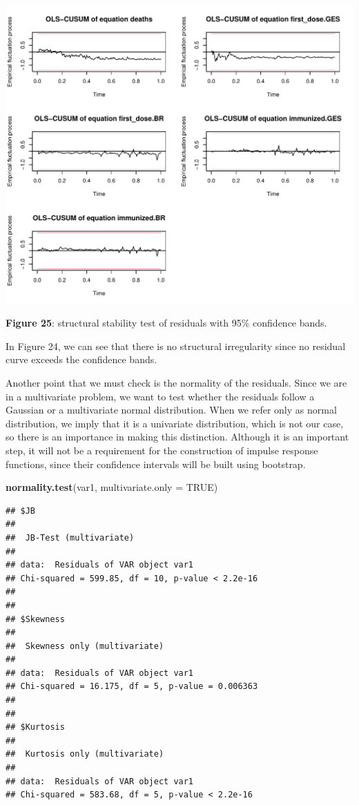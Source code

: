 \documentclass[
]{article}
\newenvironment{Shaded}{\begin{snugshade}}{\end{snugshade}}
\newcommand{\AttributeTok}[1]{\textcolor[rgb]{0.13,0.29,0.53}{#1}}
\newcommand{\ConstantTok}[1]{\textcolor[rgb]{0.56,0.35,0.01}{#1}}
\newcommand{\FunctionTok}[1]{\textcolor[rgb]{0.13,0.29,0.53}{\textbf{#1}}}
\newcommand{\NormalTok}[1]{#1}
\renewenvironment{Shaded}{\begin{mdframed}[ backgroundcolor=shadecolor, linecolor = shadecolor, leftmargin=\dimexpr\leftmargin-2pt\relax, innerleftmargin=1.6pt, innertopmargin=5pt, skipabove=10pt,skipbelow=3pt ]}{\end{mdframed}}
\begin{document}
\begin{center}\includegraphics[width=\linewidth]{IF_results_ENG_files/figure-latex/unnamed-chunk-36-1} \end{center}

\textbf{Figure 25}: structural stability test of residuals with 95\%
confidence bands.

In Figure 24, we can see that there is no structural irregularity since
no residual curve exceeds the confidence bands.

Another point that we must check is the normality of the residuals.
Since we are in a multivariate problem, we want to test whether the
residuals follow a Gaussian or a multivariate normal distribution. When
we refer only as normal distribution, we imply that it is a univariate
distribution, which is not our case, so there is an importance in making
this distinction. Although it is an important step, it will not be a
requirement for the construction of impulse response functions, since
their confidence intervals will be built using bootstrap.

\begin{Shaded}
\begin{Highlighting}[]
\FunctionTok{normality.test}\NormalTok{(var1, }\AttributeTok{multivariate.only =} \ConstantTok{TRUE}\NormalTok{)}
\end{Highlighting}
\end{Shaded}

\begin{verbatim}
## $JB
## 
##  JB-Test (multivariate)
## 
## data:  Residuals of VAR object var1
## Chi-squared = 599.85, df = 10, p-value < 2.2e-16
## 
## 
## $Skewness
## 
##  Skewness only (multivariate)
## 
## data:  Residuals of VAR object var1
## Chi-squared = 16.175, df = 5, p-value = 0.006363
## 
## 
## $Kurtosis
## 
##  Kurtosis only (multivariate)
## 
## data:  Residuals of VAR object var1
## Chi-squared = 583.68, df = 5, p-value < 2.2e-16
\end{verbatim}
\end{document}
